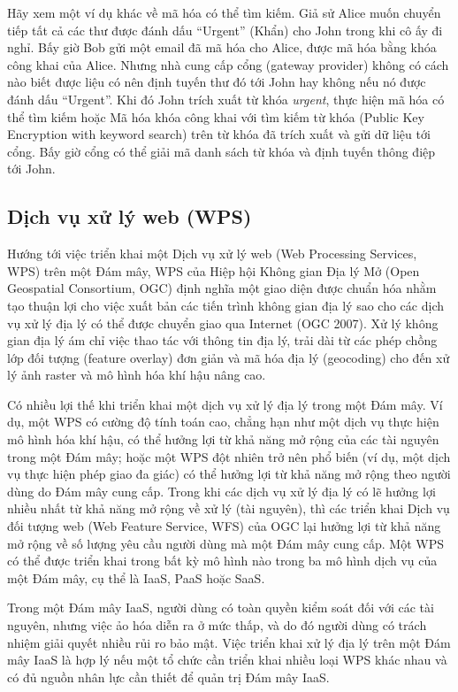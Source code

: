 Hãy xem một ví dụ khác về mã hóa có thể tìm kiếm. Giả sử Alice muốn chuyển tiếp tất cả các thư được đánh dấu ``Urgent'' (Khẩn) cho John trong khi cô ấy đi nghỉ. Bấy giờ Bob gửi một email đã mã hóa cho Alice, được mã hóa bằng khóa công khai của Alice. Nhưng nhà cung cấp cổng (gateway provider) không có cách nào biết được liệu có nên định tuyến thư đó tới John hay không nếu nó được đánh dấu ``Urgent''. Khi đó John trích xuất từ khóa \textit{urgent}, thực hiện mã hóa có thể tìm kiếm hoặc Mã hóa khóa công khai với tìm kiếm từ khóa (Public Key Encryption with keyword search) trên từ khóa đã trích xuất và gửi dữ liệu tới cổng. Bấy giờ cổng có thể giải mã danh sách từ khóa và định tuyến thông điệp tới John.

\subsection{Dịch vụ xử lý web (WPS)}

Hướng tới việc triển khai một Dịch vụ xử lý web (Web Processing Services, WPS) trên một Đám mây, WPS của Hiệp hội Không gian Địa lý Mở (Open Geospatial Consortium, OGC) định nghĩa một giao diện được chuẩn hóa nhằm tạo thuận lợi cho việc xuất bản các tiến trình không gian địa lý sao cho các dịch vụ xử lý địa lý có thể được chuyển giao qua Internet (OGC 2007). Xử lý không gian địa lý ám chỉ việc thao tác với thông tin địa lý, trải dài từ các phép chồng lớp đối tượng (feature overlay) đơn giản và mã hóa địa lý (geocoding) cho đến xử lý ảnh raster và mô hình hóa khí hậu nâng cao.

Có nhiều lợi thế khi triển khai một dịch vụ xử lý địa lý trong một Đám mây. Ví dụ, một WPS có cường độ tính toán cao, chẳng hạn như một dịch vụ thực hiện mô hình hóa khí hậu, có thể hưởng lợi từ khả năng mở rộng của các tài nguyên trong một Đám mây; hoặc một WPS đột nhiên trở nên phổ biến (ví dụ, một dịch vụ thực hiện phép giao đa giác) có thể hưởng lợi từ khả năng mở rộng theo người dùng do Đám mây cung cấp. Trong khi các dịch vụ xử lý địa lý có lẽ hưởng lợi nhiều nhất từ khả năng mở rộng về xử lý (tài nguyên), thì các triển khai Dịch vụ đối tượng web (Web Feature Service, WFS) của OGC lại hưởng lợi từ khả năng mở rộng về số lượng yêu cầu người dùng mà một Đám mây cung cấp. Một WPS có thể được triển khai trong bất kỳ mô hình nào trong ba mô hình dịch vụ của một Đám mây, cụ thể là IaaS, PaaS hoặc SaaS.

Trong một Đám mây IaaS, người dùng có toàn quyền kiểm soát đối với các tài nguyên, nhưng việc ảo hóa diễn ra ở mức thấp, và do đó người dùng có trách nhiệm giải quyết nhiều rủi ro bảo mật. Việc triển khai xử lý địa lý trên một Đám mây IaaS là hợp lý nếu một tổ chức cần triển khai nhiều loại WPS khác nhau và có đủ nguồn nhân lực cần thiết để quản trị Đám mây IaaS.

